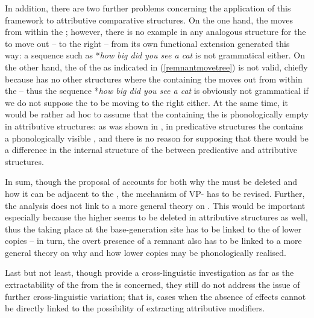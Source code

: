 In addition, there are two further problems concerning the application of this framework to attributive comparative structures. On the one hand, the  moves from within the ; however, there is no example in any analogous structure for the  to move out -- to the right -- from its own functional extension generated this way: a sequence such as *\textit{how big did you see a cat} is not grammatical either. On the other hand, the  of the  as indicated in (\ref{remnantmovetree}) is not valid, chiefly because  has no other structures where the  containing the  moves out from within the  -- thus the sequence *\textit{how big did you see a cat} is obviously not grammatical if we do not suppose the  to be moving to the right either. At the same time, it would be rather ad hoc to assume that the  containing the  is phonologically empty in attributive structures: as was shown in , in predicative structures the  contains a phonologically visible , and there is no reason for supposing that there would be a difference in the internal structure of the  between predicative and attributive structures.

In sum, though the proposal of \citet{kennedymerchant2000} accounts for both why the  must be deleted and how it can be adjacent to the , the mechanism of VP- has to be revised. Further, the analysis does not link  to a more general theory on . This would be important especially because the higher  seems to be deleted in attributive structures as well, thus the  taking place at the base-generation site has to be linked to the  of lower copies – in turn, the overt presence of a remnant  also has to be linked to a more general theory on why and how lower copies may be phonologically realised.

Last but not least, though \citet{kennedymerchant2000} provide a cross-lin\-guis\-tic investigation as far as the extractability of the   from the  is concerned, they still do not address the issue of further cross-linguistic variation; that is, cases when the absence of  effects cannot be directly linked to the possibility of extracting attributive modifiers.

